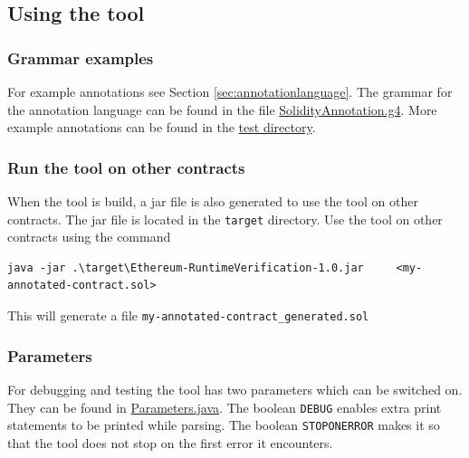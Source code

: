 \documentclass[a4paper]{article}
\begin{document}
\hypertarget{using-the-tool}{%
\subsection{Using the tool}\label{using-the-tool}}

\hypertarget{grammar-examples}{%
\subsubsection{Grammar examples}\label{grammar-examples}}

For example annotations see Section \ref{sec:annotationlanguage}. The grammar for the annotation
language can be found in the file
\href{https://github.com/LarsStegeman/EthereumRuntimeMonitoring/blob/master/src/main/antlr4/SolidityAnnotated.g4}{SolidityAnnotation.g4}. More
example annotations can be found in the \href{https://github.com/LarsStegeman/EthereumRuntimeMonitoring/tree/master/src/test/contracts}{test
directory}.

\hypertarget{run-the-tool-on-other-contracts}{%
\subsubsection{Run the tool on other
contracts}\label{run-the-tool-on-other-contracts}}

When the tool is build, a jar file is also generated to use the tool on
other contracts. The jar file is located in the \texttt{target}
directory. Use the tool on other contracts using the command

\begin{verbatim}
java -jar .\target\Ethereum-RuntimeVerification-1.0.jar     <my-annotated-contract.sol>
\end{verbatim}

This will generate a file \texttt{my-annotated-contract\_generated.sol}

\hypertarget{parameters}{%
\subsubsection{Parameters}\label{parameters}}

For debugging and testing the tool has two parameters which can be
switched on. They can be found in
\href{https://github.com/LarsStegeman/EthereumRuntimeMonitoring/blob/master/src/main/java/utils/Parameters.java}{Parameters.java}. The boolean
\texttt{DEBUG} enables extra print statements to be printed while
parsing. The boolean \texttt{STOPONERROR} makes it so that the tool does
not stop on the first error it encounters.
\end{document}
